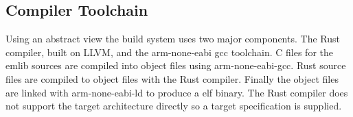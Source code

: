 \subsection{Compiler Toolchain}

Using an abstract view the build system uses two major components.
The Rust compiler, built on LLVM, and the arm-none-eabi gcc toolchain.
C files for the emlib sources are compiled into object files using arm-none-eabi-gcc.
Rust source files are compiled to object files with the Rust compiler.
Finally the object files are linked with arm-none-eabi-ld to produce a elf binary.
The Rust compiler does not support the target architecture directly so a target specification is supplied.

